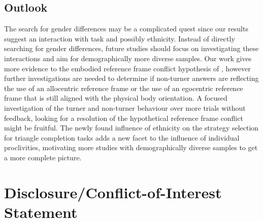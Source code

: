 \documentclass{frontiersSCNS} %
\begin{document}
\subsection{Outlook}
The search for gender differences may be a complicated quest since our results suggest an interaction with task and possibly ethnicity. Instead of directly searching for gender differences, future studies should focus on investigating these interactions and aim for demographically more diverse samples.
Our work gives more evidence to the embodied reference frame conflict hypothesis of \cite{Avraamides2004}, however further investigations are needed to determine if non-turner answers are reflecting the use of an allocentric reference frame or the use of an egocentric reference frame that is still aligned with the physical body orientation. A focused investigation of the turner and non-turner behaviour over more trials without feedback, looking for a resolution of the hypothetical reference frame conflict might be fruitful.
The newly found influence of ethnicity on the strategy selection for triangle completion tasks adds a new facet to the influence of individual proclivities, motivating more studies with demographically diverse samples to get a more complete picture.

\section*{Disclosure/Conflict-of-Interest Statement}
\end{document}
